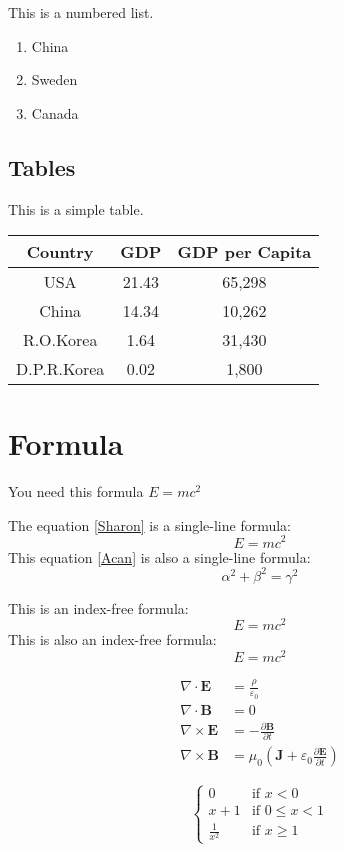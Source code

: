\documentclass{article}
\begin{document}
	This is a numbered list.

	\begin{enumerate}
		\item China
		\item Sweden
		\item Canada
	\end{enumerate}

	\subsection{Tables}

	\par This is a simple table.

	\begin{tabular}{ccc}
		\toprule
		Country & GDP & GDP per Capita \\
		\midrule
		USA & 21.43 & 65,298 \\
		China & 14.34 & 10,262 \\
		R.O.Korea & 1.64 & 31,430 \\
		D.P.R.Korea & 0.02 & 1,800 \\
		\bottomrule
	\end{tabular}

	\section{Formula}

	You need this formula $E=mc^2$

	The equation \eqref{Sharon} is a single-line formula:
	\begin{equation}\label{Sharon}
		E=mc^2
	\end{equation}
	This equation \eqref{Acan} is also a single-line formula:
	\begin{equation}\label{Acan}
		\alpha^2+\beta^2 = \gamma^2
	\end{equation}

	This is an index-free formula:
	\[E=mc^2\]
	This is also an index-free formula:
	$$E=mc^2$$

	\begin{equation}
		\begin{split}
			\nabla \cdot \mathbf{E} &= \frac{\rho}{\varepsilon_0} \\
    		\nabla \cdot \mathbf{B} &= 0 \\
    		\nabla \times \mathbf{E} &= -\frac{\partial \mathbf{B}}{\partial t} \\
    		\nabla \times \mathbf{B} &= \mu_0\left(\mathbf{J} + \varepsilon_0 \frac{\partial \mathbf{E}}{\partial t}\right)
		\end{split}
	\end{equation}

	\begin{equation}
		\begin{cases}
			0&\text{if $x<0$} \\
			x+1&\text{if $0\leq x<1$} \\
			\frac{1}{x^2}&\text{if $x\geq 1$}
		\end{cases}
	\end{equation}
\end{document}
